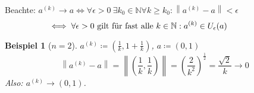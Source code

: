 \documentclass[12pt]{extreport} %
\newcommand{\N}{\mathbb{N}}
\theoremstyle{named}
\theoremstyle{nnamed}
\theoremstyle{itshape}
\theoremstyle{normal}
\newtheorem*{beispiel*}{Beispiel}
\begin{document}
Beachte: $a^{(k)} \longrightarrow a \iff \forall \epsilon > 0 ~\exists k_{0} \in \N \forall k \geq k_{0}: \left\| a^{(k)} - a \right\| < \epsilon$
	\[ \quad \iff \forall \epsilon > 0 \text{ gilt für fast alle } k \in \N : a^{(k)} \in U_{\epsilon}(a) \hspace{1.75cm} \]


\begin{beispiel*}[$n = 2$]
	$a^{(k)} \coloneqq \left( \frac{1}{k} , 1 + \frac{1}{k} \right)$, $a \coloneqq (0, 1)$	
	\[ \left\| a^{(k)} - a \right\| = \left\| \left( \frac{1}{k} , \frac{1}{k} \right) \right\| = \left( \frac{2}{k^{2}} \right)^{\frac{1}{2}} = \frac{\sqrt{2}}{k} \longrightarrow 0 \]
	Also: $a^{(k)} \longrightarrow (0, 1)$.
\end{beispiel*}

 
\end{document}
